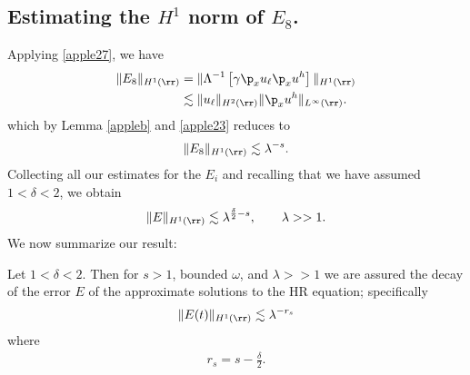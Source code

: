 \subsection{Estimating the $H^1$ norm of $\hyperref[all_errors_together]{E_8}$.} Applying \eqref{apple27}, we have
\begin{equation}
	\begin{split}
		\|E_8\|_{H^1(\rr)}
		& = \|\Lambda^{-1}\left[ \gamma \p_x u_\ell \p_x u^h \right]\|_{H^1(\rr)}
		\\
		& \lesssim \|u_\ell\|_{H^2(\rr)} \|\p_x u^h\|_{L^\infty(\rr)}.
		\label{apple33}
	\end{split}
\end{equation}
which by Lemma \ref{appleb} and \eqref{apple23} reduces to
\begin{equation}
	\begin{split}
		\|E_8\|_{H^1(\rr)} \lesssim \lambda^{-s}.
		\label{apple34}
	\end{split}
\end{equation}
Collecting all our estimates for the $E_i$ and recalling that we have assumed
$1<\delta<2$, we obtain
\begin{equation*}
	\begin{split}
		\|E\|_{H^1(\rr)}
		 \lesssim \lambda^{\frac{\delta}{2} -s }, \qquad \lambda >>1.
	\end{split}
\end{equation*}
We now summarize our result:
%
%
\begin{proposition}
	Let $1<\delta<2$. Then for $s > 1$, bounded $\omega$, and
	$\lambda >>1$ we are assured the decay of the error $E$ of the
	approximate solutions to the HR equation; specifically
	\begin{equation}
		\begin{split}
			\|E(t)\|_{H^1(\rr)} \lesssim \lambda^{-r_s}
			\label{apple35}
		\end{split}
	\end{equation}
	where
	\begin{equation}
		\begin{split}
			r_s = s - \frac{\delta}{2}.   
			\label{appler_s}
		\end{split}
	\end{equation}
\end{proposition}
%
%
%
%
%
